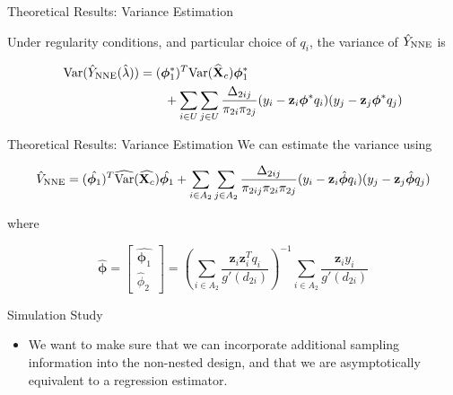\documentclass{beamer} %
\newcommand{\Var}{{\text{Var}}}
\renewcommand{\bf}[1]{\mathbf{#1}}
\begin{document}
\begin{frame}{Theoretical Results: Variance Estimation}

\begin{theorem}
  \label{thm:nnve}
  Under regularity conditions, and particular choice of $q_i$,
  the variance of $\hat Y_{\rm{NNE}}$ is 

  \begin{align*}
    \Var(\hat Y_{\rm{NNE}}(\hat \lambda))
    &= (\bm \phi_1^*)^T \Var(\widehat{\bf X}_c) \bm \phi_1^* \\ 
    &\qquad + 
    \sum_{i \in U} \sum_{j \in U} \frac{\Delta_{2ij}}{\pi_{2i}\pi_{2j}} 
      (y_i - \bf z_i \bm \phi^* q_i)(y_j - \bf z_j \bm \phi^* q_j)\\
  \end{align*}

\end{theorem}
\end{frame}

\begin{frame}{Theoretical Results: Variance Estimation}
  We can estimate the variance using

  \begin{align*}
    \hat V_{\rm{NNE}} 
    &= (\hat{\bm \phi_1})^T \widehat{\Var}(\widehat{\bf X_c}) \hat{\bm \phi_1} + 
    \sum_{i \in A_2} \sum_{j \in A_2} \frac{\Delta_{2ij}}{\pi_{2ij}\pi_{2i}\pi_{2j}} 
    (y_i - \bf z_i \hat{\bm \phi} q_i)(y_j - \bf z_j \hat{\bm \phi} q_j) \\
  \end{align*}

  where 
  
  $$\hat{\bm \phi} =
  \begin{bmatrix}
    \hat{\bm \phi_1} \\ \hat \phi_2
  \end{bmatrix} = 
  \left(\sum_{i \in A_2} \frac{\bf z_i \bf z_i^T q_i}{g'(d_{2i})} 
  \right)^{-1}
  \sum_{i \in A_2} \frac{\bf z_i y_i}{g'(d_{2i})} 
  $$

\end{frame}

\begin{frame}{Simulation Study}
  
  \begin{itemize}
    \item We want to make sure that we can incorporate additional sampling
      information into the non-nested design, and that we are asymptotically
      equivalent to a regression estimator.
  \end{itemize}

\end{frame}
\end{document}

